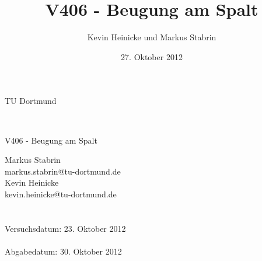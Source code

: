 \documentclass{scrartcl}
\title{V406 - Beugung am Spalt}
\date{27. Oktober 2012}
\author{Kevin Heinicke und Markus Stabrin}
\begin{document}

	\begin{center}
		\large
		TU Dortmund
	\end{center}\\

	\begin{center}
		\Huge
		V406 - Beugung am Spalt
	\end{center}

	\vspace{9cm}
	\begin{center}
		\begin{minipage}[b]{8cm}
			\large
			Markus Stabrin \\
			\small
			markus.stabrin@tu-dortmund.de \\

			\large
			Kevin Heinicke\\
			\small
			kevin.heinicke@tu-dortmund.de \\
			\\
			\\

			Versuchsdatum: 23. Oktober 2012 \\
			\\
			Abgabedatum: 30. Oktober 2012
		\end{minipage}
	\end{center}

	\newpage

	

	

	

	
\end{document}
